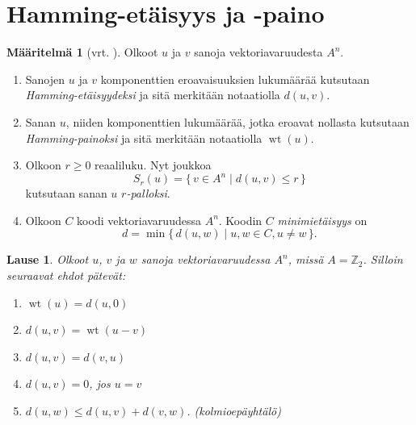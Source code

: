\documentclass[a4paper,12pt,leqno,oneside]{report} %
\theoremstyle{plain}
\newtheorem{lause}{Lause}[chapter]
\theoremstyle{plain}
\theoremstyle{definition}
\newtheorem{maaritelma}{Määritelmä}[chapter]
\DeclareMathOperator{\wt}{wt}
\theoremstyle{remark}
\numberwithin{equation}{chapter}
\newcommand*{\Zset}{\mathbb{Z}}  %
\begin{document}


    \section{Hamming-etäisyys ja -paino}
    \begin{maaritelma}[vrt. {\cite[s.~492]{PA}}]\label{maar:perus}
        Olkoot $u$ ja $v$ sanoja vektoriavaruudesta $A^n$.
        \begin{enumerate}
            \item\label{kht:etaisyys} Sanojen $u$ ja $v$ komponenttien eroavaisuuksien lukumäärää kutsutaan \break{} \emph{Hamming-etäisyydeksi} ja sitä merkitään notaatiolla $d(u,v)$.
            \item\label{kht:paino} Sanan $u$, niiden komponenttien lukumäärää, jotka eroavat nollasta kutsutaan \emph{Hamming-painoksi} ja sitä merkitään notaatiolla
                $\wt(u)$.
            \item Olkoon $r\ge0$ reaaliluku. Nyt joukkoa
                \[
                    S_r(u) = \{\,v \in A^n \mid d(u, v) \le r \,\}
                \]
                kutsutaan sanan $u$ \emph{$r$-palloksi}.
            \item Olkoon $C$ koodi vektoriavaruudessa $A^n$. Koodin $C$ \emph{minimietäisyys} on
                \[
                    d = \min\{\, d(u, w) \mid u, w \in C, u \neq w \,\}.
                \]
        \end{enumerate}
    \end{maaritelma}

    \begin{lause}\label{lause:Hamming}
        Olkoot $u$, $v$ ja $w$ sanoja vektoriavaruudessa $A^n$, missä $A = \Zset_2$. Silloin seuraavat ehdot pätevät:
        \begin{enumerate}
            \item\label{kht:painoetaisyys} $\wt(u) = d(u, 0)$
            \item\label{kht:etaisyyspaino} $d(u, v) = \wt(u - v)$
            \item\label{kht:vaihdannaisuus}$d(u, v) = d(v, u)$
            \item\label{kht:nollaetaisyys} $d(u, v) = 0$, jos $u = v$
            \item\label{kht:kolmioey} $d(u, w) \le d(u, v) + d(v, w)$. \quad (kolmioepäyhtälö)
        \end{enumerate}
    \end{lause}
\end{document}
